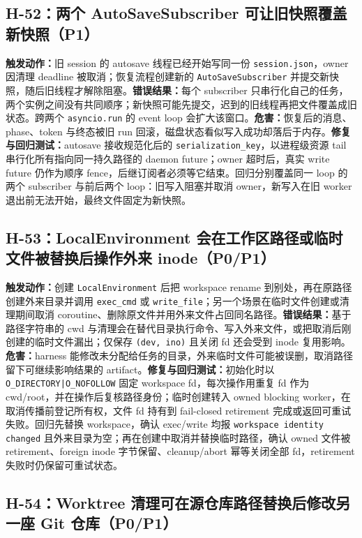 \documentclass[11pt,a4paper,fontset=fandol]{ctexart}
\newcommand{\code}[1]{\texttt{#1}}
\begin{document}
\subsection{H-52：两个 AutoSaveSubscriber 可让旧快照覆盖新快照（P1）}

\textbf{触发动作：}旧 session 的 autosave 线程已经开始写同一份 \code{session.json}，owner 因清理 deadline 被取消；恢复流程创建新的 \code{AutoSaveSubscriber} 并提交新快照，随后旧线程才解除阻塞。\textbf{错误结果：}每个 subscriber 只串行化自己的任务，两个实例之间没有共同顺序；新快照可能先提交，迟到的旧线程再把文件覆盖成旧状态。跨两个 \code{asyncio.run} 的 event loop 会扩大该窗口。\textbf{危害：}恢复后的消息、phase、token 与终态被旧 run 回滚，磁盘状态看似写入成功却落后于内存。\textbf{修复与回归测试：}autosave 接收规范化后的 \code{serialization\_key}，以进程级资源 tail 串行化所有指向同一持久路径的 daemon future；owner 超时后，真实 write future 仍作为顺序 fence，后继订阅者必须等它结束。回归分别覆盖同一 loop 的两个 subscriber 与前后两个 loop：旧写入阻塞并取消 owner，新写入在旧 worker 退出前无法开始，最终文件固定为新快照。

\subsection{H-53：LocalEnvironment 会在工作区路径或临时文件被替换后操作外来 inode（P0/P1）}

\textbf{触发动作：}创建 \code{LocalEnvironment} 后把 workspace rename 到别处，再在原路径创建外来目录并调用 \code{exec\_cmd} 或 \code{write\_file}；另一个场景在临时文件创建或清理期间取消 coroutine、删除原文件并用外来文件占回同名路径。\textbf{错误结果：}基于路径字符串的 cwd 与清理会在替代目录执行命令、写入外来文件，或把取消后刚创建的临时文件漏出；仅保存 \code{(dev, ino)} 且关闭 fd 还会受到 inode 复用影响。\textbf{危害：}harness 能修改未分配给任务的目录，外来临时文件可能被误删，取消路径留下可继续影响结果的 artifact。\textbf{修复与回归测试：}初始化时以 \code{O\_DIRECTORY|O\_NOFOLLOW} 固定 workspace fd，每次操作用重复 fd 作为 cwd/root，并在操作后复核路径身份；临时创建转入 owned blocking worker，在取消传播前登记所有权，文件 fd 持有到 fail-closed retirement 完成或返回可重试失败。回归先替换 workspace，确认 exec/write 均报 \code{workspace identity changed} 且外来目录为空；再在创建中取消并替换临时路径，确认 owned 文件被 retirement、foreign inode 字节保留、cleanup/abort 幂等关闭全部 fd，retirement 失败时仍保留可重试状态。

\subsection{H-54：Worktree 清理可在源仓库路径替换后修改另一座 Git 仓库（P0/P1）}
\end{document}

